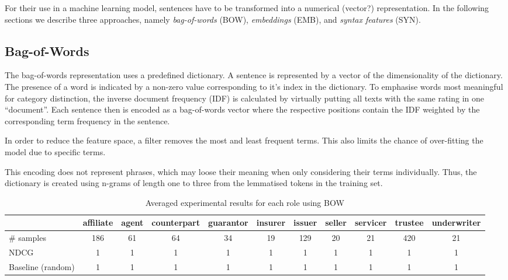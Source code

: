
For their use in a machine learning model, sentences have to be transformed into a numerical (vector?) representation.
In the following sections we describe three approaches, namely \textit{bag-of-words} (BOW), \textit{embeddings} (EMB), and \textit{syntax features} (SYN).


\subsection{Bag-of-Words}
The bag-of-words representation uses a predefined dictionary.
A sentence is represented by a vector of the dimensionality of the dictionary.
The presence of a word is indicated by a non-zero value corresponding to it's index in the dictionary.
To emphasise words most meaningful for category distinction, the inverse document frequency (IDF) is calculated by virtually putting all texts with the same rating in one ``document''. 
Each sentence then is encoded as a bag-of-words vector where the respective positions contain the IDF weighted by the corresponding term frequency in the sentence.

In order to reduce the feature space, a filter removes the most and least frequent terms.
This also limits the chance of over-fitting the model due to specific terms.

This encoding does not represent phrases, which may loose their meaning when only considering their terms individually.
Thus, the dictionary is created using n-grams of length one to three from the lemmatised tokens in the training set.
\begin{table*}
	\caption{Averaged experimental results for each role using BOW}
	\label{tab:roleresults}
	\begin{tabular}{lcccccccccc}
		\toprule
		& affiliate & agent & counterpart & guarantor & insurer & issuer & seller & servicer & trustee & underwriter \\
		\midrule
		\# samples & 186       & 61    & 64          & 34        & 19      & 129    & 20     & 21       & 420     & 21          \\
		NDCG & 1 & 1 & 1 & 1 & 1 & 1 & 1 & 1 & 1 & 1 \\
		Baseline (random) & 1 & 1 & 1 & 1 & 1 & 1 & 1 & 1 & 1 & 1 \\
		\bottomrule
	\end{tabular}
\end{table*}

